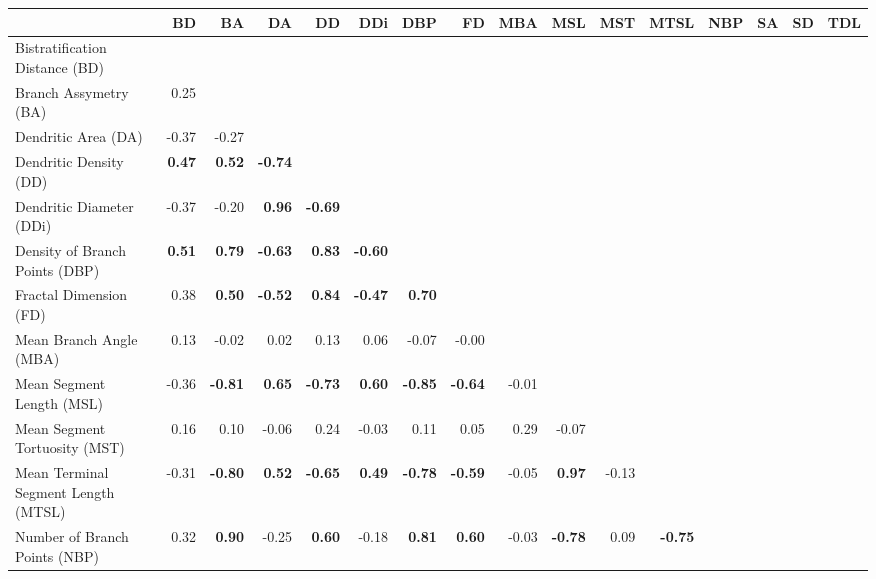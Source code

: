 \documentclass[11pt]{article}
\begin{document}
\clearpage




\begin{sidewaystable}
\begin{tabular}{lrrrrrrrrrrrrrrr}
\toprule
& BD& BA& DA& DD& DDi& DBP& FD& MBA& MSL& MST& MTSL& NBP& SA& SD& TDL\\
\midrule
Bistratification Distance (BD) & \textbf{}  &  &  &  &  &  &  &  &  &  &  &  &  &  & \\
Branch Assymetry (BA) & 0.25 & \textbf{}  &  &  &  &  &  &  &  &  &  &  &  &  & \\
Dendritic Area (DA) & -0.37 & -0.27 & \textbf{}  &  &  &  &  &  &  &  &  &  &  &  & \\
Dendritic Density (DD) & \textbf{0.47} & \textbf{0.52} & \textbf{-0.74} & \textbf{}  &  &  &  &  &  &  &  &  &  &  & \\
Dendritic Diameter (DDi) & -0.37 & -0.20 & \textbf{0.96} & \textbf{-0.69} & \textbf{}  &  &  &  &  &  &  &  &  &  & \\
Density of Branch Points (DBP) & \textbf{0.51} & \textbf{0.79} & \textbf{-0.63} & \textbf{0.83} & \textbf{-0.60} & \textbf{}  &  &  &  &  &  &  &  &  & \\
Fractal Dimension (FD) & 0.38 & \textbf{0.50} & \textbf{-0.52} & \textbf{0.84} & \textbf{-0.47} & \textbf{0.70} & \textbf{}  &  &  &  &  &  &  &  & \\
Mean Branch Angle (MBA) & 0.13 & -0.02 & 0.02 & 0.13 & 0.06 & -0.07 & -0.00 & \textbf{}  &  &  &  &  &  &  & \\
Mean Segment Length (MSL) & -0.36 & \textbf{-0.81} & \textbf{0.65} & \textbf{-0.73} & \textbf{0.60} & \textbf{-0.85} & \textbf{-0.64} & -0.01 & \textbf{}  &  &  &  &  &  & \\
Mean Segment Tortuosity (MST) & 0.16 & 0.10 & -0.06 & 0.24 & -0.03 & 0.11 & 0.05 & 0.29 & -0.07 & \textbf{}  &  &  &  &  & \\
Mean Terminal Segment Length (MTSL) & -0.31 & \textbf{-0.80} & \textbf{0.52} & \textbf{-0.65} & \textbf{0.49} & \textbf{-0.78} & \textbf{-0.59} & -0.05 & \textbf{0.97} & -0.13 & \textbf{}  &  &  &  & \\
Number of Branch Points (NBP) & 0.32 & \textbf{0.90} & -0.25 & \textbf{0.60} & -0.18 & \textbf{0.81} & \textbf{0.60} & -0.03 & \textbf{-0.78} & 0.09 & \textbf{-0.75} & \textbf{}  &  &  & \\

\end{tabular}
\end{sidewaystable}
\end{document}

